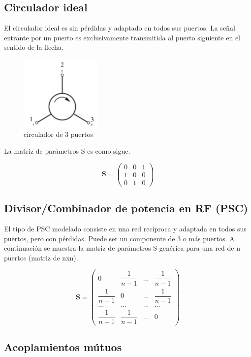 \subsection{Circulador ideal}

El circulador ideal es sin pérdidas y adaptado en todos sus puertos. La señal entrante por un puerto es exclusivamente
transmitida al puerto siguiente en el sentido de la flecha.

\begin{figure}[H]
 \centering
 \includegraphics[width=4cm]{gfx/circulator.png}
 \caption{circulador de 3 puertos}
 \label{fig:circulator}
\end{figure}

La matriz de parámetros S es como sigue.

$$
\mathbf{S} = \begin{pmatrix} 0 & 0 & 1\\1 & 0 & 0\\0 & 1 & 0\end{pmatrix}
$$


\subsection{Divisor/Combinador de potencia en RF (PSC)}

El tipo de PSC modelado consiste en una red recíproca y adaptada en todos sus puertos, pero con pérdidas. Puede ser un
componente de 3 o más puertos. A continuación se muestra la matriz de parámetros S genérica para una red de n puertos
(matriz de nxn).

$$
\mathbf{S} = \begin{pmatrix} 0 & \dfrac{1}{n-1} & ... & \dfrac{1}{n-1}\\
							 \dfrac{1}{n-1} & 0 & ... & \dfrac{1}{n-1}\\
							 ... & ... & ... & ... \\
							 \dfrac{1}{n-1} & \dfrac{1}{n-1} & ... & 0 \end{pmatrix}
$$

\subsection{Acoplamientos mútuos}

